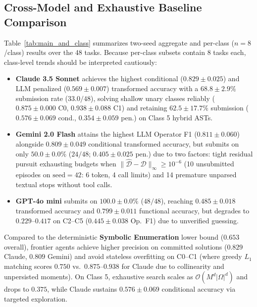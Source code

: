 \documentclass[sigconf]{acmart}
\begin{document}
\subsection{Cross-Model and Exhaustive Baseline Comparison}
Table~\ref{tab:main_and_class} summarizes two-seed aggregate and per-class ($n=8$/class) results over the 48 tasks. Because per-class subsets contain 8 tasks each, class-level trends should be interpreted cautiously:
\begin{itemize}
    \item \textbf{Claude 3.5 Sonnet} achieves the highest conditional ($0.829 \pm 0.025$) and LLM penalized ($0.569 \pm 0.007$) transformed accuracy with a $68.8 \pm 2.9\%$ submission rate ($33.0/48$), solving shallow unary classes reliably ($0.875\pm 0.000$ C0, $0.938\pm 0.088$ C1) and retaining $62.5 \pm 17.7\%$ submission ($0.576 \pm 0.069$ cond., $0.354 \pm 0.059$ pen.) on Class 5 hybrid ASTs.
    \item \textbf{Gemini 2.0 Flash} attains the highest LLM Operator F1 ($0.811 \pm 0.060$) alongside $0.809 \pm 0.049$ conditional transformed accuracy, but submits on only $50.0 \pm 0.0\%$ ($24/48$; $0.405 \pm 0.025$ pen.) due to two factors: tight residual pursuit exhausting budgets when $\|\widehat{\mathcal{D}}-\mathcal{D}\|_\infty \ge 10^{-6}$ (10 unsubmitted episodes on $\text{seed}=42$: 6 token, 4 call limits) and 14 premature unparsed textual stops without tool calls.
    \item \textbf{GPT-4o mini} submits on $100.0 \pm 0.0\%$ ($48/48$), reaching $0.485 \pm 0.018$ transformed accuracy and $0.799 \pm 0.011$ functional accuracy, but degrades to $0.229$--$0.417$ on C2--C5 ($0.445 \pm 0.038$ Op.\ F1) due to unverified guessing.
\end{itemize}
Compared to the deterministic \textbf{Symbolic Enumeration} lower bound ($0.653$ overall), frontier agents achieve higher precision on committed solutions ($0.829$ Claude, $0.809$ Gemini) and avoid stateless overfitting on C0--C1 (where greedy $L_1$ matching scores $0.750$ vs.\ $0.875$--$0.938$ for Claude due to collinearity and unpersisted moments). On Class 5, exhaustive search scales as $\mathcal{O}(M^d|\Omega|^d)$ and drops to $0.375$, while Claude sustains $0.576 \pm 0.069$ conditional accuracy via targeted exploration.
\end{document}
